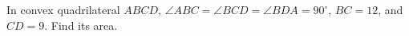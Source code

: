In convex quadrilateral $ABCD$, $\angle ABC=\angle BCD=\angle BDA=90^\circ$, $BC=12$, and $CD=9$. Find its area.
